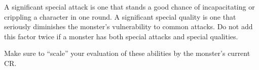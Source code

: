 \documentclass{article}
\begin{document}
A significant special attack is one that stands a good chance of incapacitating 
or crippling a character in one round. A significant special quality is one that 
seriously diminishes the monster's vulnerability to common attacks. Do not add 
this factor twice if a monster has both special attacks and special qualities.

Make sure to ``scale'' your evaluation of these abilities by the monster's current 
CR.

\newpage
\end{document}
